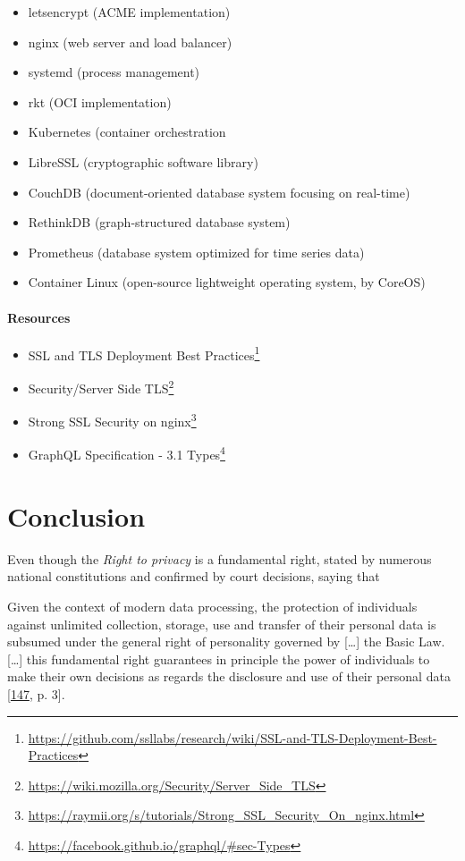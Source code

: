 \documentclass[12pt,english,a4paper,titlepage,cleardoublepage=empty,dottedtoc]{report}
\renewcommand{\href}[2]{#2\footnote{\url{#1}}}
\providecommand{\tightlist}{%
  \setlength{\itemsep}{0pt}\setlength{\parskip}{0pt}}
\let\origquote\quote
\let\endorigquote\endquote
\renewenvironment{quote}{%
    \origquote
    \itshape
}
{\endorigquote}
\begin{document}
\begin{itemize}
\tightlist
\item
  letsencrypt (ACME implementation)
\item
  nginx (web server and load balancer)
\item
  systemd (process management)
\item
  rkt (OCI implementation)
\item
  Kubernetes (container orchestration
\item
  LibreSSL (cryptographic software library)
\item
  CouchDB (document-oriented database system focusing on real-time)
\item
  RethinkDB (graph-structured database system)
\item
  Prometheus (database system optimized for time series data)
\item
  Container Linux (open-source lightweight operating system, by CoreOS)
\end{itemize}

\subsubsection*{Resources}\label{resources}

\begin{itemize}
\tightlist
\item
  \href{https://github.com/ssllabs/research/wiki/SSL-and-TLS-Deployment-Best-Practices}{SSL
  and TLS Deployment Best Practices}
\item
  \href{https://wiki.mozilla.org/Security/Server_Side_TLS}{Security/Server
  Side TLS}
\item
  \href{https://raymii.org/s/tutorials/Strong_SSL_Security_On_nginx.html}{Strong
  SSL Security on nginx}
\item
  \href{https://facebook.github.io/graphql/\#sec-Types}{GraphQL
  Specification - 3.1 Types}
\end{itemize}

\chapter{Conclusion}\label{conclusion}

Even though the \emph{Right to privacy} is a fundamental right, stated
by numerous national constitutions and confirmed by court decisions,
saying that

\begin{quote}
Given the context of modern data processing, the protection of
individuals against unlimited collection, storage, use and transfer of
their personal data is subsumed under the general right of personality
governed by {[}\ldots{}{]} the Basic Law. {[}\ldots{}{]} this
fundamental right guarantees in principle the power of individuals to
make their own decisions as regards the disclosure and use of their
personal data
{[}\protect\hyperlink{ref-court-decision_1983_census-act-germany}{147},
p. 3{]}.
\end{quote}
\end{document}
